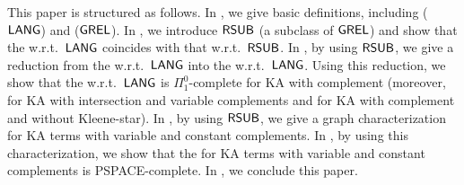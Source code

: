 This paper is structured as follows.
In , we give basic definitions, including  ($\mathsf{LANG}$) and  ($\mathsf{GREL}$).
In , we introduce $\mathsf{RSUB}$ (a subclass of $\mathsf{GREL}$) and show that the  w.r.t.\ $\mathsf{LANG}$ coincides with that w.r.t.\ $\mathsf{RSUB}$.
In , by using $\mathsf{RSUB}$, we give a reduction from the  w.r.t.\ $\mathsf{LANG}$ into the  w.r.t.\ $\mathsf{LANG}$.
Using this reduction, we show that the  w.r.t.\ $\mathsf{LANG}$ is $\Pi^{0}_{1}$-complete for KA with complement (moreover, for KA with intersection and variable complements and for KA with complement and without Kleene-star).
In , by using $\mathsf{RSUB}$, we give a graph characterization for KA terms with variable and constant complements.
In , by using this characterization, we show that the  for KA terms with variable and constant complements is PSPACE-complete.
In , we conclude this paper.